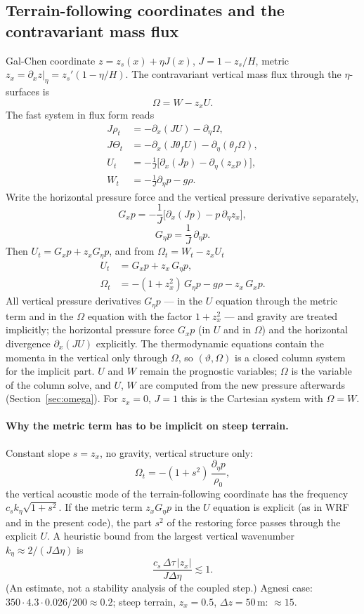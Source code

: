 \documentclass[11pt,a4paper]{article}
\newcommand{\dtau}{\Delta\tau}
\newcommand{\tv}{\vartheta}   %
\begin{document}
\subsection{Terrain-following coordinates and the contravariant mass flux}\label{sec:tf}
Gal-Chen coordinate $z=z_s(x)+\eta J(x)$, $J=1-z_s/H$, metric $z_x=\partial_xz|_\eta=z_s'(1-\eta/H)$.
The contravariant vertical mass flux through the $\eta$-surfaces is
\[
\Omega=W-z_xU .
\]
The fast system in flux form reads
\begin{align*}
J\rho_t&=-\partial_x(JU)-\partial_\eta\Omega,\\
J\Theta_t&=-\partial_x(J\theta_fU)-\partial_\eta(\theta_f\Omega),\\
U_t&=-\frac1J\big[\partial_x(Jp)-\partial_\eta(z_xp)\big],\\
W_t&=-\frac1J\partial_\eta p-g\rho .
\end{align*}
Write the horizontal pressure force and the vertical pressure derivative separately,
\[
G_xp=-\frac1J\big[\partial_x(Jp)-p\,\partial_\eta z_x\big],
\]
\[
G_\eta p=\frac1J\,\partial_\eta p .
\]
Then $U_t=G_xp+z_xG_\eta p$, and from $\Omega_t=W_t-z_xU_t$
\begin{align*}
U_t&=G_xp+z_x\,G_\eta p,\\
\Omega_t&=-(1+z_x^2)\,G_\eta p-g\rho-z_x\,G_xp .
\end{align*}
All vertical pressure derivatives $G_\eta p$ --- in the $U$ equation through the metric term and in the $\Omega$
equation with the factor $1+z_x^2$ --- and gravity are treated implicitly; the horizontal pressure force
$G_xp$ (in $U$ and in $\Omega$) and the horizontal divergence $\partial_x(JU)$ explicitly. The thermodynamic equations
contain the momenta in the vertical only through $\Omega$, so $(\tv,\Omega)$ is a closed column system for the
implicit part. $U$ and $W$ remain the prognostic variables; $\Omega$ is the variable of the column solve,
and $U$, $W$ are computed from the new pressure afterwards (Section~\ref{sec:omega}). For $z_x=0$, $J=1$ this is the
Cartesian system with $\Omega=W$.

\paragraph{Why the metric term has to be implicit on steep terrain.} Constant slope $s=z_x$, no
gravity, vertical structure only:
\[
\Omega_t=-(1+s^2)\,\frac{\partial_\eta p}{\rho_0},
\]
the vertical acoustic mode of the terrain-following coordinate has the frequency $c_sk_\eta\sqrt{1+s^2}$. If
the metric term $z_xG_\eta p$ in the $U$ equation is explicit (as in WRF and in the present code), the part
$s^2$ of the restoring force passes through the explicit $U$. A heuristic bound from the largest vertical
wavenumber $k_\eta\approx2/(J\Delta\eta)$ is
\[
\frac{c_s\,\dtau\,|z_x|}{J\Delta\eta}\lesssim1 .
\]
(An estimate, not a stability analysis of the coupled step.) Agnesi case: $350\cdot4.3\cdot0.026/200\approx0.2$;
steep terrain, $z_x=0.5$, $\Delta z=50$\,m: $\approx15$.
\end{document}
